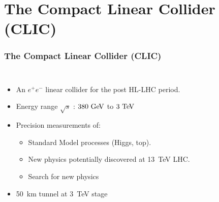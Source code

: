\section{The Compact Linear Collider (CLIC)}
\begin{frame}
  \frametitle{}
  \tableofcontents[currentsection]
\end{frame}
{
  \begin{frame}
    \frametitle{The Compact Linear Collider (CLIC)}

    \vspace{-1cm}
    \begin{columns}
      \begin{itemize}
      \item An $e^{+}e^{-}$ linear collider for the post HL-LHC period.
      \item Energy range $\sqrt{s}$ : \textcolor{Green}{$380\,\mathrm{\,Ge\kern -0.1em V}$} to
        \textcolor{Green}{$3\,\mathrm{\,Te\kern -0.1em V}$}
      \item Precision measurements of:
        \begin{itemize}
        \item Standard Model processes (Higgs, top).
        \item New physics potentially discovered at 13~TeV LHC.
        \item Search for new physics
        \end{itemize}
      \item 50~km tunnel at 3~TeV stage
      \end{itemize}
      

\end{columns}
\end{frame}}
